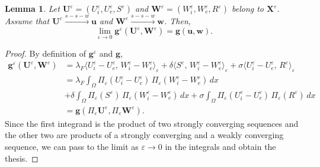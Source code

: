 \documentclass[a4paper,11pt]{article}
\newtheorem{lemma}[theorem]{Lemma}
\theoremstyle{definition}
\numberwithin{equation}{section}
\newcommand{\e}{\varepsilon}
\begin{document}
\begin{lemma}
	\label{lemma:gamma_g}
	Let $\mathbf U^\e = (U_i^\e, U_e^\e, S^\e)$ and $\mathbf W^\e = (W_i^\e, W_e^\e, R^\e)$ belong to $\mathbf{X}^\e$. Assume that $\mathbf U^\e \xrightarrow{s-s-w} \mathbf u$ and $\mathbf W^\e \xrightarrow{s-s-w} \mathbf w$. %
	Then,
	\begin{equation*}
		\lim_{\e\to0} \mathbf{g}^\e(\mathbf U^\e, \mathbf W^\e) = \mathbf{g}(\mathbf u, \mathbf w).
	\end{equation*}
\end{lemma}
\begin{proof} 
	By definition of $\mathbf{g}^\e$ and $\mathbf g$,
	\begin{align*}
		\mathbf{g}^\e(\mathbf U^\e,\mathbf W^\e)
		&=
		\lambda_F\langle U_i^\e-U_e^\e,\,
		W_i^\e-W_e^\e\rangle_\e +\delta\langle S^\e,\,
		W_i^\e-W_e^\e\rangle_\e
		+\sigma\langle U_i^\e-U_e^\e,\,
		R^\e\rangle_\e \\
		&=\lambda_F\int_\Omega
		\Pi_\e(U_i^\e-U_e^\e)\,
		\Pi_\e(W_i^\e-W_e^\e)\,dx\\
		&+\delta\int_\Omega
		\Pi_\e (S^\e)\,
		\Pi_\e(W_i^\e-W_e^\e)\,dx  +\sigma\int_\Omega
		\Pi_\e(U_i^\e-U_e^\e)\,
		\Pi_\e (R^\e)\,dx \\
		& = \mathbf{g}\left(\Pi_\e\mathbf U^\e,\Pi_\e\mathbf W^\e \right).
	\end{align*}
	Since the first integrand is the product of two strongly converging sequences and the other two are products of a strongly converging and a weakly converging sequence, we can pass to the limit as $\e \to 0$ in the integrals and obtain the thesis. %

\end{proof}
\end{document}
